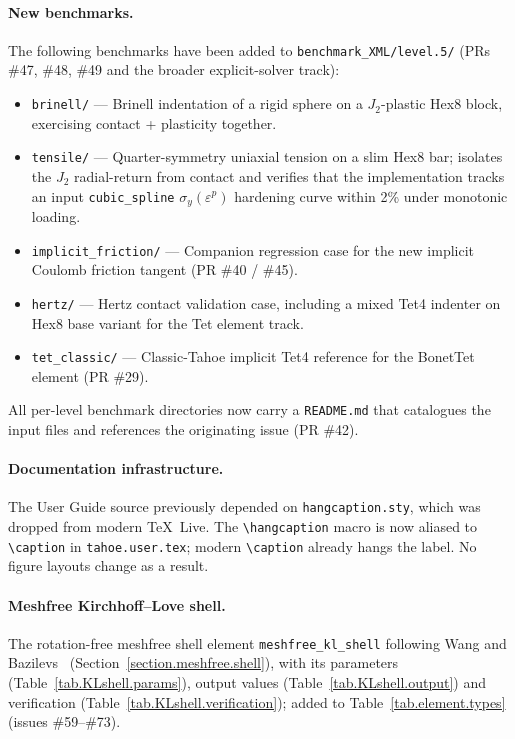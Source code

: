 \paragraph{New benchmarks.}
The following benchmarks have been added to
\texttt{benchmark\_XML/level.5/} (PRs \#47, \#48, \#49 and the broader
explicit-solver track):
\begin{itemize}
\item \texttt{brinell/} --- Brinell indentation of a rigid sphere on a
$J_{2}$-plastic Hex8 block, exercising contact + plasticity together.
\item \texttt{tensile/} --- Quarter-symmetry uniaxial tension on a slim
Hex8 bar; isolates the $J_{2}$ radial-return from contact and verifies
that the implementation tracks an input \texttt{cubic\_spline}
$\sigma_{y}(\varepsilon^{p})$ hardening curve within 2\% under
monotonic loading.
\item \texttt{implicit\_friction/} --- Companion regression case for
the new implicit Coulomb friction tangent (PR \#40 / \#45).
\item \texttt{hertz/} --- Hertz contact validation case, including a
mixed Tet4 indenter on Hex8 base variant for the Tet element track.
\item \texttt{tet\_classic/} --- Classic-Tahoe implicit Tet4 reference
for the BonetTet element (PR \#29).
\end{itemize}
All per-level benchmark directories now carry a \texttt{README.md}
that catalogues the input files and references the originating issue
(PR \#42).

\paragraph{Documentation infrastructure.}
The User Guide source previously depended on \texttt{hangcaption.sty},
which was dropped from modern \TeX{}~Live.  The \texttt{\textbackslash hangcaption}
macro is now aliased to \texttt{\textbackslash caption} in
\texttt{tahoe.user.tex}; modern \texttt{\textbackslash caption} already
hangs the label.  No figure layouts change as a result.

\paragraph{Meshfree Kirchhoff--Love shell.}
The rotation-free meshfree shell element \texttt{meshfree\_kl\_shell} following Wang and
Bazilevs~\cite{WangBazilevs2025} (Section~\ref{section.meshfree.shell}), with its parameters
(Table~\ref{tab.KLshell.params}), output values (Table~\ref{tab.KLshell.output}) and verification
(Table~\ref{tab.KLshell.verification}); added to Table~\ref{tab.element.types} (issues \#59--\#73).

